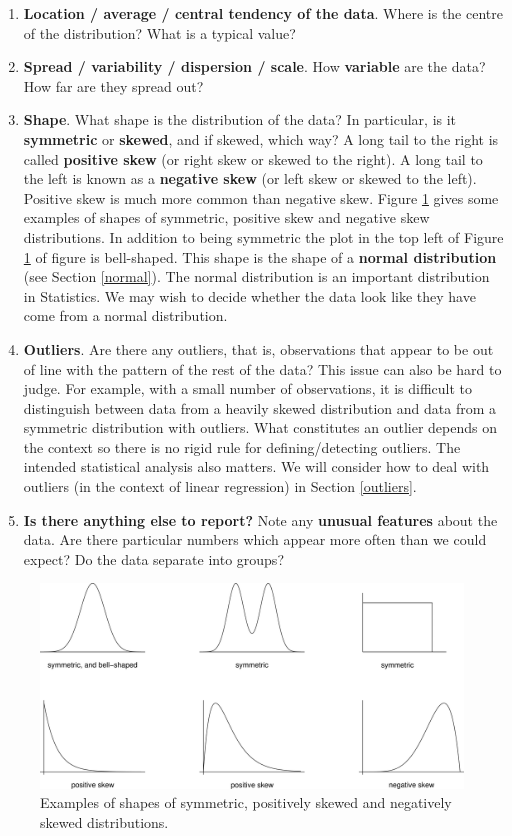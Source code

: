 \documentclass[
  11pt,
  british,
  openany, a4paper]{book}
\providecommand{\tightlist}{%
  \setlength{\itemsep}{0pt}\setlength{\parskip}{0pt}}
\begin{document}
\begin{enumerate}
\def\labelenumi{\arabic{enumi}.}
\tightlist
\item
  \textbf{Location / average / central tendency of the data}. Where is the centre of the distribution? What is a typical value?\\
\item
  \textbf{Spread / variability / dispersion / scale}. How \textbf{variable} are the data? How far are they spread out?
\item
  \textbf{Shape}. What shape is the distribution of the data? In particular, is it \textbf{symmetric} or \textbf{skewed}, and if skewed, which way? A long tail to the right is called \textbf{positive skew} (or right skew or skewed to the right). A long tail to the left is known as a \textbf{negative skew} (or left skew or skewed to the left). Positive skew is much more common than negative skew. Figure \ref{fig:shapes} gives some examples of shapes of symmetric, positive skew and negative skew distributions. In addition to being symmetric the plot in the top left of Figure \ref{fig:shapes} of figure is bell-shaped. This shape is the shape of a \textbf{normal distribution} (see Section \ref{normal}). The normal distribution is an important distribution in Statistics. We may wish to decide whether the data look like they have come from a normal distribution.
\item
  \textbf{Outliers}. Are there any outliers, that is, observations that appear to be out of line with the pattern of the rest of the data? This issue can also be hard to judge. For example, with a small number of observations, it is difficult to distinguish between data from a heavily skewed distribution and data from a symmetric distribution with outliers. What constitutes an outlier depends on the context so there is no rigid rule for defining/detecting outliers. The intended statistical analysis also matters. We will consider how to deal with outliers (in the context of linear regression) in Section \ref{outliers}.
\item
  \textbf{Is there anything else to report?} Note any \textbf{unusual features}
  about the data. Are there particular numbers which appear more often than we could expect? Do the data separate into groups?
\end{enumerate}

\begin{figure}

{\centering \includegraphics[width=0.75\linewidth]{images/shapes} 

}

\caption{Examples of shapes of symmetric, positively skewed and negatively skewed distributions.}\label{fig:shapes}
\end{figure}
\end{document}
